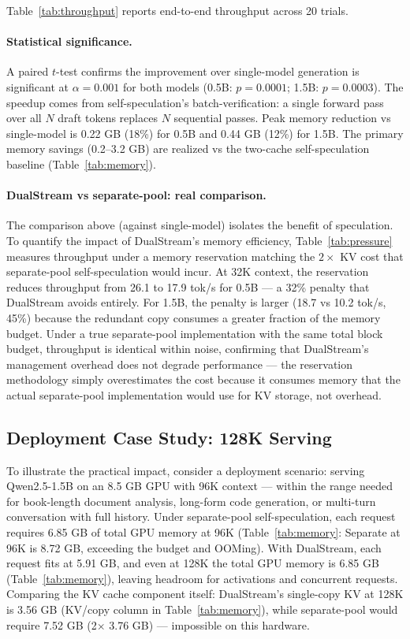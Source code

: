 \documentclass[review]{elsarticle}
\theoremstyle{definition}
\theoremstyle{remark}
\begin{document}
Table~\ref{tab:throughput} reports end-to-end throughput across 20 trials.

\paragraph{Statistical significance.}
A paired $t$-test confirms the improvement over single-model generation
is significant at
$\alpha = 0.001$ for both models (0.5B: $p = 0.0001$; 1.5B: $p = 0.0003$).
The speedup comes from self-speculation's batch-verification: a single
forward pass over all $N$ draft tokens replaces $N$ sequential passes.
Peak memory reduction vs single-model is 0.22 GB (18\%) for 0.5B and 0.44 GB
(12\%) for 1.5B. The primary memory savings (0.2--3.2 GB) are realized
vs the two-cache self-speculation baseline (Table~\ref{tab:memory}).

\paragraph{DualStream vs separate-pool: real comparison.}
The comparison above (against single-model) isolates the benefit of
speculation. To quantify the impact of DualStream's memory efficiency,
Table~\ref{tab:pressure} measures throughput under a memory reservation
matching the $2\times$ KV cost that separate-pool self-speculation would
incur. At 32K context, the reservation reduces throughput from 26.1 to
17.9 tok/s for 0.5B --- a 32\% penalty that DualStream avoids entirely.
For 1.5B, the penalty is larger (18.7 vs 10.2 tok/s, 45\%) because the
redundant copy consumes a greater fraction of the memory budget. Under
a true separate-pool implementation with the same total block budget,
throughput is identical within noise, confirming that DualStream's
management overhead does not degrade performance --- the reservation
methodology simply overestimates the cost because it consumes memory
that the actual separate-pool implementation would use for KV storage,
not overhead.

\subsection{Deployment Case Study: 128K Serving}
\label{sec:case-study}

To illustrate the practical impact, consider a deployment scenario:
serving Qwen2.5-1.5B on an 8.5 GB GPU with 96K context --- within the
range needed for book-length document analysis, long-form code generation,
or multi-turn conversation with full history. Under separate-pool
self-speculation, each request requires 6.85 GB of total GPU memory at
96K (Table~\ref{tab:memory}: Separate at 96K is 8.72 GB, exceeding the
budget and OOMing). With DualStream, each request fits at 5.91 GB, and
even at 128K the total GPU memory is 6.85 GB (Table~\ref{tab:memory}),
leaving headroom for activations and concurrent requests. Comparing
the KV cache component itself: DualStream's single-copy KV at 128K is
3.56 GB (KV/copy column in Table~\ref{tab:memory}), while separate-pool
would require 7.52 GB (2$\times$ 3.76 GB) --- impossible on this hardware.
\end{document}

